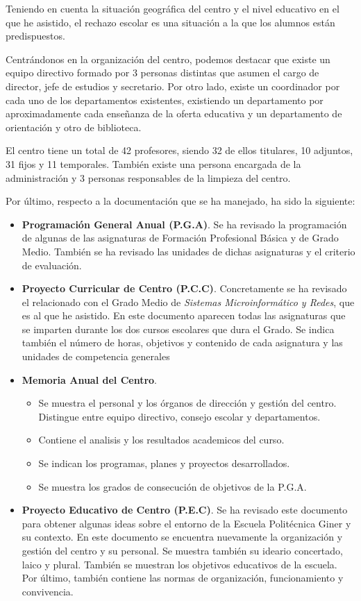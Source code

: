 \documentclass[spanish,12pt, a4paper,twoside]{paper}
\begin{document}
Teniendo en cuenta la situación geográfica del centro y el nivel educativo en el que he asistido, el rechazo escolar es una situación a la que los alumnos están predispuestos. 

Centrándonos en la organización del centro, podemos destacar que existe un equipo directivo formado por 3 personas distintas que asumen el cargo de director, jefe de estudios y secretario. Por otro lado, existe un coordinador por cada uno de los departamentos existentes, existiendo un departamento por aproximadamente cada enseñanza de la oferta educativa y un departamento de orientación y otro de biblioteca.

El centro tiene un total de 42 profesores, siendo 32 de ellos titulares, 10 adjuntos, 31 fijos y 11 temporales. También existe una persona encargada de la administración y 3 personas responsables de la limpieza del centro.

Por último, respecto a la documentación que se ha manejado, ha sido la siguiente:
\begin{itemize}
\item \textbf{Programación General Anual (P.G.A)}. Se ha revisado la programación de algunas de las asignaturas de Formación Profesional Básica y de Grado Medio. También se ha revisado las unidades de dichas asignaturas y el criterio de evaluación.
\item \textbf{Proyecto Curricular de Centro (P.C.C)}. Concretamente se ha revisado el relacionado con el Grado Medio de \textit{Sistemas Microinformático y Redes}, que es al que he asistido. En este documento aparecen todas las asignaturas que se imparten durante los dos cursos escolares que dura el Grado. Se indica también el número de horas, objetivos y contenido de cada asignatura y las unidades de competencia generales
\item \textbf{Memoria Anual del Centro}. 
\begin{itemize}
\item Se muestra el personal y los órganos de dirección y gestión del centro. Distingue entre equipo directivo, consejo escolar y departamentos.
\item Contiene el analisis y los resultados academicos del curso.
\item Se indican los programas, planes y proyectos desarrollados.
\item Se muestra los grados de consecución de objetivos de la P.G.A.
\end{itemize}
\item \textbf{Proyecto Educativo de Centro (P.E.C)}. Se ha revisado este documento para obtener algunas ideas sobre el entorno de la Escuela Politécnica Giner y su contexto. En este documento se encuentra nuevamente la organización y gestión del centro y su personal. Se muestra también su ideario concertado, laico y plural. También se muestran los objetivos educativos de la escuela. Por último, también contiene las normas de organización, funcionamiento y convivencia.
\end{itemize}
\end{document}
